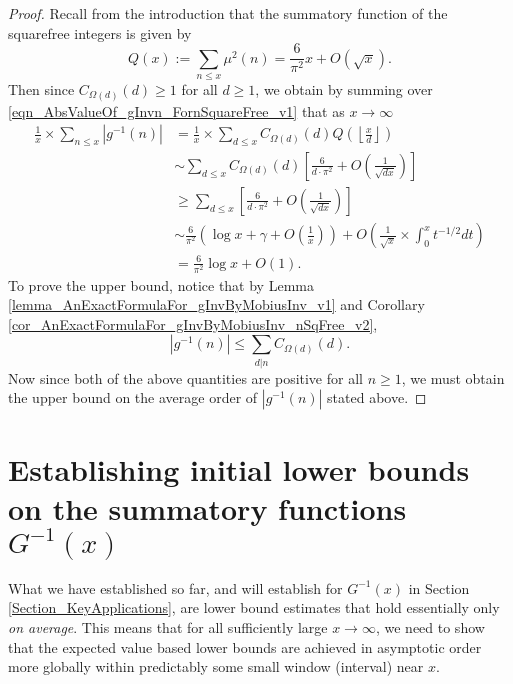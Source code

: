 \documentclass[11pt,reqno,a4letter]{article}
\numberwithin{figure}{section}
\numberwithin{table}{section}
\newcommand{\Floor}[2]{\ensuremath{\left\lfloor \frac{#1}{#2} \right\rfloor}}
\theoremstyle{plain}
\numberwithin{theorem}{section}
\theoremstyle{definition}
\begin{document}
\begin{proof}
Recall from the introduction that the summatory function of the 
squarefree integers is given by 
\[
Q(x) := \sum_{n \leq x} \mu^2(n) = \frac{6}{\pi^2} x + O(\sqrt{x}). 
\]
Then since $C_{\Omega(d)}(d) \geq 1$ for all $d \geq 1$, we obtain by summing over 
\eqref{eqn_AbsValueOf_gInvn_FornSquareFree_v1} that as $x \rightarrow \infty$ 
\begin{align*} 
\frac{1}{x} \times \sum_{n \leq x} |g^{-1}(n)| & = \frac{1}{x} \times \sum_{d \leq x} 
     C_{\Omega(d)}(d) Q\left(\Floor{x}{d}\right) \\ 
     & \sim \sum_{d \leq x} C_{\Omega(d)}(d) \left[\frac{6}{d \cdot \pi^2} + O\left(\frac{1}{\sqrt{dx}}\right) 
     \right] \\ 
     & \geq \sum_{d \leq x} \left[\frac{6}{d \cdot \pi^2} + O\left(\frac{1}{\sqrt{dx}}\right)\right] \\ 
     & \sim \frac{6}{\pi^2}\left(\log x + \gamma + O\left(\frac{1}{x}\right)\right) + 
     O\left(\frac{1}{\sqrt{x}} \times \int_0^{x} t^{-1/2} dt\right) \\ 
     & = \frac{6}{\pi^2} \log x + O(1). 
\end{align*} 
To prove the upper bound, notice that by 
Lemma \ref{lemma_AnExactFormulaFor_gInvByMobiusInv_v1} and 
Corollary \ref{cor_AnExactFormulaFor_gInvByMobiusInv_nSqFree_v2}, 
\[
|g^{-1}(n)| \leq \sum_{d|n} C_{\Omega(d)}(d). 
\]
Now since both of the above quantities are positive for all $n \geq 1$, 
we must obtain the upper bound on the average order of $|g^{-1}(n)|$
stated above. 
\end{proof} 

\newpage 
\section{Establishing initial lower bounds on the summatory functions $G^{-1}(x)$} 
\label{Section_ProofOfValidityOfAverageOrderLowerBounds} 

What we have established so far, and will establish for $G^{-1}(x)$ in 
Section \ref{Section_KeyApplications}, are lower bound estimates that hold essentially only 
\emph{on average}. 
This means that for all sufficiently large $x \rightarrow \infty$, 
we need to show that the expected value based lower bounds 
are achieved in asymptotic order more globally 
within predictably some small window (interval) near $x$. 
\end{document}
